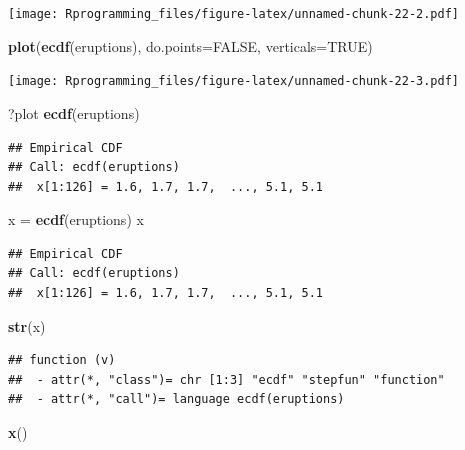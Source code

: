 \documentclass[11pt,]{krantz}
\makeatletter
\newenvironment{Shaded}{\begin{snugshade}}{\end{snugshade}}
\newcommand{\KeywordTok}[1]{\textcolor[rgb]{0.13,0.29,0.53}{\textbf{#1}}}
\newcommand{\DataTypeTok}[1]{\textcolor[rgb]{0.13,0.29,0.53}{#1}}
\newcommand{\StringTok}[1]{\textcolor[rgb]{0.31,0.60,0.02}{#1}}
\newcommand{\OtherTok}[1]{\textcolor[rgb]{0.56,0.35,0.01}{#1}}
\newcommand{\NormalTok}[1]{#1}
\newenvironment{kframe}{%
\medskip{}
\setlength{\fboxsep}{.8em}
 \def\at@end@of@kframe{}%
 \ifinner\ifhmode%
  \def\at@end@of@kframe{\end{minipage}}%
  \begin{minipage}{\columnwidth}%
 \fi\fi%
 \def\FrameCommand##1{\hskip\@totalleftmargin \hskip-\fboxsep
 \colorbox{shadecolor}{##1}\hskip-\fboxsep
     \hskip-\linewidth \hskip-\@totalleftmargin \hskip\columnwidth}%
 \MakeFramed {\advance\hsize-\width
   \@totalleftmargin\z@ \linewidth\hsize
   \@setminipage}}%
 {\par\unskip\endMakeFramed%
 \at@end@of@kframe}
\renewenvironment{Shaded}{\begin{kframe}}{\end{kframe}}
\theoremstyle{definition}
\theoremstyle{definition}
\theoremstyle{remark}
\makeatother
\begin{document}
\texttt{[image: Rprogramming\_files/figure-latex/unnamed-chunk-22-2.pdf]}

\begin{Shaded}
\begin{Highlighting}[]
\KeywordTok{plot}\NormalTok{(}\KeywordTok{ecdf}\NormalTok{(eruptions), }\DataTypeTok{do.points=}\OtherTok{FALSE}\NormalTok{, }\DataTypeTok{verticals=}\OtherTok{TRUE}\NormalTok{)}
\end{Highlighting}
\end{Shaded}

\texttt{[image: Rprogramming\_files/figure-latex/unnamed-chunk-22-3.pdf]}

\begin{Shaded}
\begin{Highlighting}[]
\NormalTok{?plot}
\KeywordTok{ecdf}\NormalTok{(eruptions)}
\end{Highlighting}
\end{Shaded}

\begin{verbatim}
## Empirical CDF 
## Call: ecdf(eruptions)
##  x[1:126] = 1.6, 1.7, 1.7,  ..., 5.1, 5.1
\end{verbatim}

\begin{Shaded}
\begin{Highlighting}[]
\NormalTok{x =}\StringTok{ }\KeywordTok{ecdf}\NormalTok{(eruptions)}
\NormalTok{x}
\end{Highlighting}
\end{Shaded}

\begin{verbatim}
## Empirical CDF 
## Call: ecdf(eruptions)
##  x[1:126] = 1.6, 1.7, 1.7,  ..., 5.1, 5.1
\end{verbatim}

\begin{Shaded}
\begin{Highlighting}[]
\KeywordTok{str}\NormalTok{(x)}
\end{Highlighting}
\end{Shaded}

\begin{verbatim}
## function (v)  
##  - attr(*, "class")= chr [1:3] "ecdf" "stepfun" "function"
##  - attr(*, "call")= language ecdf(eruptions)
\end{verbatim}

\begin{Shaded}
\begin{Highlighting}[]
\KeywordTok{x}\NormalTok{()}
\end{Highlighting}
\end{Shaded}
\end{document}

